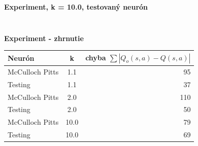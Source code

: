 \documentclass[xcolor=dvipsnames]{beamer}
\begin{document}
\begin{frame}{\bf Experiment, k = 10.0, testovaný neurón}
\begin{columns}
\begin{column}{0.5\textwidth}
\begin{figure}[ht]
        \end{figure}

	\end{column}
\end{columns}

\end{frame}

\begin{frame}[fragile]{\bf Experiment - zhrnutie}

\begin{center}
  \begin{tabular}{ l | c | r }
    \hline
    \hline
    Neurón & k & chyba $\sum|Q_o(s,a) - Q(s,a)|$\\ \hline
    McCulloch Pitts & 1.1 & 95 \\ \hline
    Testing & 1.1 & 37 \\ \hline
    McCulloch Pitts & 2.0 & 110 \\ \hline
    Testing & 2.0 & 50 \\ \hline
    McCulloch Pitts & 10.0 & 79 \\ \hline
    Testing & 10.0 & 69 \\ \hline
    \hline
  \end{tabular}
\end{center}

\end{frame}
\end{document}
